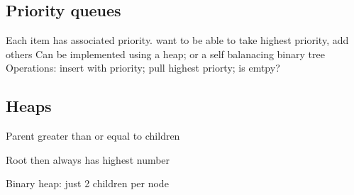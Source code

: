 \subsection{Priority queues}

Each item has associated priority. want to be able to take highest priority, add others
Can be implemented using a heap; or a self balanacing binary tree
Operations: insert with priority; pull highest priorty; is emtpy?

\subsection{Heaps}


Parent greater than or equal to children

Root then always has highest number

Binary heap: just 2 children per node

